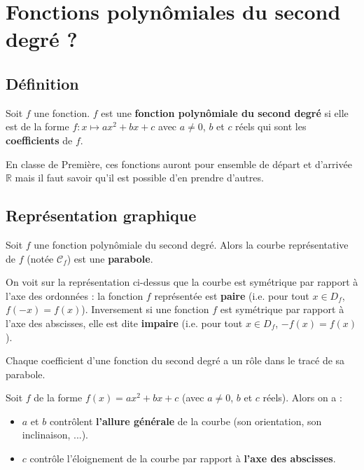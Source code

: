 


	
	\section{Fonctions polynômiales du second degré ?}
	
	\subsection{Définition}
	
	\begin{formula}[Définition]
		Soit $f$ une fonction. $f$ est une \textbf{fonction polynômiale du second degré} si elle est de la forme $f : x \mapsto ax^2 + bx + c$ avec $a \neq 0$, $b$ et $c$ réels qui sont les \textbf{coefficients} de $f$.
	\end{formula}
	
	En classe de Première, ces fonctions auront pour ensemble de départ et d'arrivée $\mathbb{R}$ mais il faut savoir qu'il est possible d'en prendre d'autres.
	
	\subsection{Représentation graphique}
	
	\begin{formula}[Parabole]
		Soit $f$ une fonction polynômiale du second degré. Alors la courbe représentative de $f$ (notée $\mathcal{C}_f$) est une \textbf{parabole}.
	\end{formula}
	
	
	\begin{tip}
		On voit sur la représentation ci-dessus que la courbe est symétrique par rapport à l'axe des ordonnées : la fonction $f$ représentée est \textbf{paire} (i.e. pour tout $x \in D_f$, $f(-x) = f(x)$).
		\newpar
		Inversement si une fonction $f$ est symétrique par rapport à l'axe des abscisses, elle est dite \textbf{impaire} (i.e. pour tout $x \in D_f$, $-f(x) = f(x)$).
	\end{tip}
	
	Chaque coefficient d'une fonction du second degré a un rôle dans le tracé de sa parabole.
	
	\begin{formula}
		Soit $f$ de la forme $f(x) = ax^2 + bx +c$ (avec $a \neq 0$, $b$ et $c$ réels). Alors on a :
		\begin{itemize}
			\item $a$ et $b$ contrôlent \textbf{l'allure générale} de la courbe (son orientation, son inclinaison, ...).
			\item $c$ contrôle l'éloignement de la courbe par rapport à \textbf{l'axe des abscisses}.
		\end{itemize}
	\end{formula}
	
